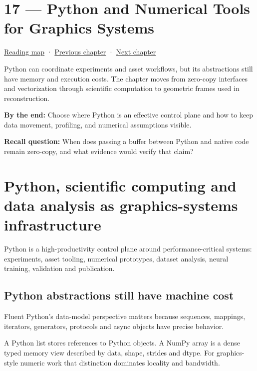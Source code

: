 \hypertarget{01-foundations-i-ch017}{}
\chapter{17 --- Python and Numerical Tools for Graphics Systems}\label{01-foundations-i-ch017-python-and-numerical-tools-for-graphics-systems}

\hyperref[volume-reading-map]{Reading map} · \hyperref[01-foundations-i-ch016-profile-gpus-and-respect-apple-ownership-boundaries]{Previous chapter} · \hyperref[01-foundations-i-ch018-vectors-for-light-and-frames]{Next chapter}

Python can coordinate experiments and asset workflows, but its abstractions still have memory and execution costs. The chapter moves from zero-copy interfaces and vectorization through scientific computation to geometric frames used in reconstruction.

\textbf{By the end:} Choose where Python is an effective control plane and how to keep data movement, profiling, and numerical assumptions visible.

\textbf{Recall question:} When does passing a buffer between Python and native code remain zero-copy, and what evidence would verify that claim?

\chapter{Python, scientific computing and data analysis as graphics-systems infrastructure}\label{01-foundations-i-ch017-python-scientific-computing-and-data-analysis-as-graphics-systems-infrastructure}

Python is a high-productivity control plane around performance-critical systems: experiments, asset tooling, numerical prototypes, dataset analysis, neural training, validation and publication.

\section{Python abstractions still have machine cost}\label{01-foundations-i-ch017-python-abstractions-still-have-machine-cost}

Fluent Python's data-model perspective matters because sequences, mappings, iterators, generators, protocols and async objects have precise behavior.

A Python list stores references to Python objects. A NumPy array is a dense typed memory view described by data, shape, strides and dtype. For graphics-style numeric work that distinction dominates locality and bandwidth.

